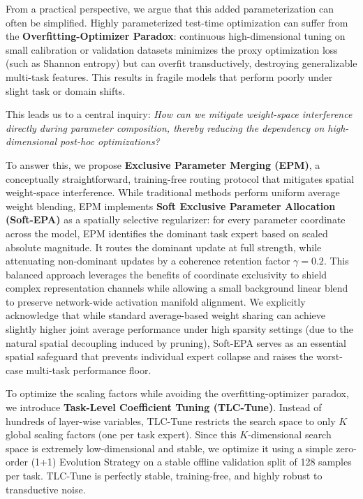 From a practical perspective, we argue that this added parameterization can often be simplified. Highly parameterized test-time optimization can suffer from the \textbf{Overfitting-Optimizer Paradox}: continuous high-dimensional tuning on small calibration or validation datasets minimizes the proxy optimization loss (such as Shannon entropy) but can overfit transductively, destroying generalizable multi-task features. This results in fragile models that perform poorly under slight task or domain shifts.

This leads us to a central inquiry: \emph{How can we mitigate weight-space interference directly during parameter composition, thereby reducing the dependency on high-dimensional post-hoc optimizations?}

To answer this, we propose \textbf{Exclusive Parameter Merging (EPM)}, a conceptually straightforward, training-free routing protocol that mitigates spatial weight-space interference. While traditional methods perform uniform average weight blending, EPM implements \textbf{Soft Exclusive Parameter Allocation (Soft-EPA)} as a spatially selective regularizer: for every parameter coordinate across the model, EPM identifies the dominant task expert based on scaled absolute magnitude. It routes the dominant update at full strength, while attenuating non-dominant updates by a coherence retention factor $\gamma = 0.2$. This balanced approach leverages the benefits of coordinate exclusivity to shield complex representation channels while allowing a small background linear blend to preserve network-wide activation manifold alignment. We explicitly acknowledge that while standard average-based weight sharing can achieve slightly higher joint average performance under high sparsity settings (due to the natural spatial decoupling induced by pruning), Soft-EPA serves as an essential spatial safeguard that prevents individual expert collapse and raises the worst-case multi-task performance floor.

To optimize the scaling factors while avoiding the overfitting-optimizer paradox, we introduce \textbf{Task-Level Coefficient Tuning (TLC-Tune)}. Instead of hundreds of layer-wise variables, TLC-Tune restricts the search space to only $K$ global scaling factors (one per task expert). Since this $K$-dimensional search space is extremely low-dimensional and stable, we optimize it using a simple zero-order (1+1) Evolution Strategy on a stable offline validation split of 128 samples per task. TLC-Tune is perfectly stable, training-free, and highly robust to transductive noise.

